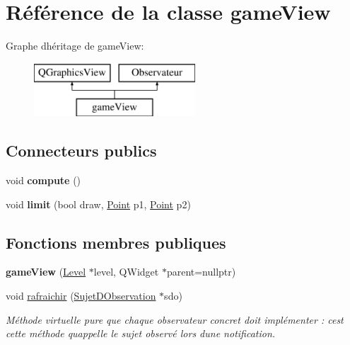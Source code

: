 \hypertarget{classgame_view}{}\section{Référence de la classe game\+View}
\label{classgame_view}
Graphe d\textquotesingle{}héritage de game\+View\+:\begin{figure}[H]
\begin{center}
\leavevmode
\includegraphics[height=2.000000cm]{classgame_view}
\end{center}
\end{figure}
\subsection*{Connecteurs publics}
\begin{DoxyCompactItemize}
\item 
\mbox{\label{classgame_view_a5d79ea7172d23e36def6215432707af4}} 
void {\bfseries compute} ()
\item 
\mbox{\label{classgame_view_a5ceb8f9cf61ad82c15b015be37772d73}} 
void {\bfseries limit} (bool draw, \mbox{\hyperlink{class_point}{Point}} p1, \mbox{\hyperlink{class_point}{Point}} p2)
\end{DoxyCompactItemize}
\subsection*{Fonctions membres publiques}
\begin{DoxyCompactItemize}
\item 
\mbox{\label{classgame_view_a0725f9e3dda1a1f2bab5e2aa066ad797}} 
{\bfseries game\+View} (\mbox{\hyperlink{class_level}{Level}} $\ast$level, Q\+Widget $\ast$parent=nullptr)
\item 
void \mbox{\hyperlink{classgame_view_a027b8c569f2861ac7633e859eadfae59}{rafraichir}} (\mbox{\hyperlink{class_sujet_d_observation}{Sujet\+D\+Observation}} $\ast$sdo)
\begin{DoxyCompactList}\small\item\em Méthode virtuelle pure que chaque observateur concret doit implémenter \+: c\textquotesingle{}est cette méthode qu\textquotesingle{}appelle le sujet observé lors d\textquotesingle{}une notification. \end{DoxyCompactList}\end{DoxyCompactItemize}


